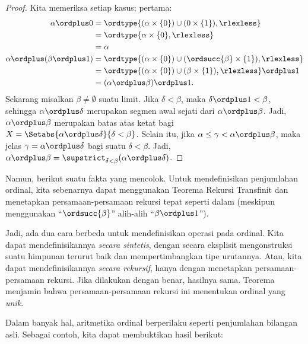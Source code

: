 \documentclass[../../../include/open-logic-section]{subfiles}
\begin{document}
\begin{proof}
Kita memeriksa setiap kasus; pertama:
\begin{align*}
	\alpha \ordplus  0 
	& = \ordtype{(\alpha \times \{0\}) \cup (0 \times \{1\}), \rlexless} \\
	&= \ordtype{\alpha \times \{0\}, \rlexless}\\
	&= \alpha\\
	\alpha \ordplus (\beta \ordplus  1) 
	&= \ordtype{(\alpha\times \{0\}) \cup (\ordsucc{\beta}\times \{1\}), \rlexless} \\
	&= \ordtype{(\alpha\times \{0\}) \cup (\beta \times \{1\}), \rlexless} \ordplus 1\\
	&= (\alpha \ordplus  \beta) \ordplus  1.
\end{align*}
Sekarang misalkan $\beta\neq\emptyset$ suatu limit. Jika $\delta<\beta$,
maka $\delta\ordplus1<\beta$, sehingga $\alpha\ordplus\delta$ merupakan
segmen awal sejati dari $\alpha\ordplus\beta$. Jadi,
$\alpha\ordplus\beta$ merupakan batas atas ketat bagi
$X=\Setabs{\alpha\ordplus\delta}{\delta<\beta}$. Selain itu, jika
$\alpha\leq\gamma<\alpha\ordplus\beta$, maka jelas
$\gamma=\alpha\ordplus\delta$ bagi suatu $\delta<\beta$. Jadi,
$\alpha\ordplus\beta=\supstrict_{\delta<\beta}(\alpha\ordplus\delta)$.
\end{proof}

Namun, berikut suatu fakta yang mencolok. Untuk mendefinisikan penjumlahan
ordinal, kita sebenarnya dapat menggunakan Teorema Rekursi Transfinit dan
menetapkan persamaan-persamaan rekursi tepat seperti dalam
 (meskipun menggunakan ``$\ordsucc{\beta}$''
alih-alih ``$\beta\ordplus1$'').

Jadi, ada dua cara berbeda untuk mendefinisikan operasi pada ordinal. Kita
dapat mendefinisikannya \emph{secara sintetis}, dengan secara eksplisit
mengonstruksi suatu himpunan terurut baik dan mempertimbangkan tipe urutannya.
Atau, kita dapat mendefinisikannya \emph{secara rekursif}, hanya dengan
menetapkan persamaan-persamaan rekursi. Jika dilakukan dengan benar, hasilnya
sama. Teorema  menjamin
bahwa persamaan-persamaan rekursi ini menentukan ordinal yang \emph{unik}.

Dalam banyak hal, aritmetika ordinal berperilaku seperti penjumlahan bilangan
asli. Sebagai contoh, kita dapat membuktikan hasil berikut:
\end{document}
